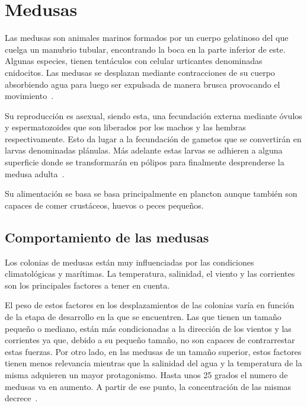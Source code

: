 

\section{Medusas}
Las medusas son animales marinos formados por un cuerpo gelatinoso del que cuelga un manubrio tubular, encontrando la boca en la parte inferior de este. Algunas especies, tienen tentáculos con celular urticantes denominadas cnidocitos. Las medusas se desplazan mediante contracciones de su cuerpo absorbiendo agua para luego ser expulsada de manera brusca provocando el movimiento~\cite{wiki:medusas}.

Su reproducción es asexual, siendo esta, una fecundación externa mediante óvulos y espermatozoides que son liberados por los machos y las hembras respectivamente. Esto da lugar a la fecundación de gametos que se convertirán en larvas denominadas plánulas. Más adelante estas larvas se adhieren a alguna superficie donde se transformarán en pólipos para finalmente desprenderse la medusa adulta~\cite{noauthor_reproduccion_2016}.


Su alimentación se basa se basa principalmente en plancton aunque también son capaces de comer crustáceos, huevos o peces pequeños.

\subsection{Comportamiento de las medusas}
Los colonias de medusas están muy influenciadas por las condiciones climatológicas y marítimas. La temperatura, salinidad, el viento y las corrientes son los principales factores a tener en cuenta.

El peso de estos factores en los desplazamientos de las colonias varía en función de la etapa de desarrollo en la que se encuentren. Las que tienen un tamaño pequeño o mediano, están más condicionadas a la dirección de los vientos y las corrientes ya que, debido a su pequeño tamaño, no son capaces de contrarrestar estas fuerzas. Por otro lado, en las medusas de un tamaño superior, estos factores tienen menos relevancia mientras que la salinidad del agua y la temperatura de la misma adquieren un mayor protagonismo. Hasta unos 25 grados el numero de medusas va en aumento. A partir de ese punto, la concentración de las mismas decrece~\cite{canepa_environmental_2017}.

